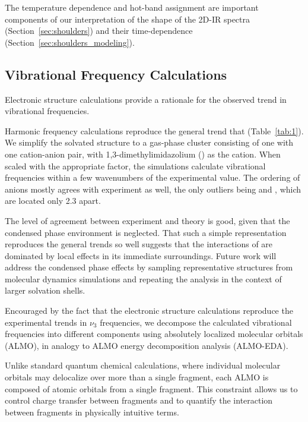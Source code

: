 \documentclass[%
  class = book,%
  crop = false,%
  float = true,%
  multi = true,%
  preview = false,%
]{standalone}
\let\cite\autocite
\begin{document}
{The temperature dependence and hot-band assignment are important components of our interpretation of the shape of the 2D-IR spectra (Section~\ref{sec:shoulders}) and their time-dependence (Section~\ref{sec:shoulders_modeling}).

\subsection{Vibrational Frequency Calculations}
\label{sec:vib_calcs}

Electronic structure calculations provide a rationale for the observed trend in vibrational frequencies.

Harmonic frequency calculations reproduce the general trend that  (Table~\ref{tab:1}).  We simplify the solvated  structure to a gas-phase cluster consisting of one  with one cation-anion pair, with 1,3-dimethylimidazolium () as the cation. When scaled with the appropriate factor\cite{Merrick2007}, the simulations calculate vibrational frequencies within a few wavenumbers of the experimental value. The ordering of anions mostly agrees with experiment as well, the only outliers being \ce{[TFA]-} and \ce{[SCN]-}, which are located only \SI{2.3}{\wavenumber} apart.

The level of agreement between experiment and theory is good, given that the condensed phase environment is neglected. That such a simple representation reproduces the general trends so well suggests that the interactions of  are dominated by local effects in its immediate surroundings. Future work will address the condensed phase effects by sampling representative structures from molecular dynamics simulations and repeating the analysis in the context of larger solvation shells.

Encouraged by the fact that the electronic structure calculations reproduce the experimental trends in \(\nu_3\) frequencies, we decompose the calculated vibrational frequencies into different components using absolutely localized molecular orbitals (ALMO), in analogy to ALMO energy decomposition analysis (ALMO-EDA).\cite{Khaliullin2006,Khaliullin2007,Khaliullin2008}

Unlike standard quantum chemical calculations, where individual molecular orbitals may delocalize over more than a single fragment, each ALMO is composed of atomic orbitals from a single fragment. This constraint allows us to control charge transfer between fragments and to quantify the interaction between fragments in physically intuitive terms.

}
\end{document}
